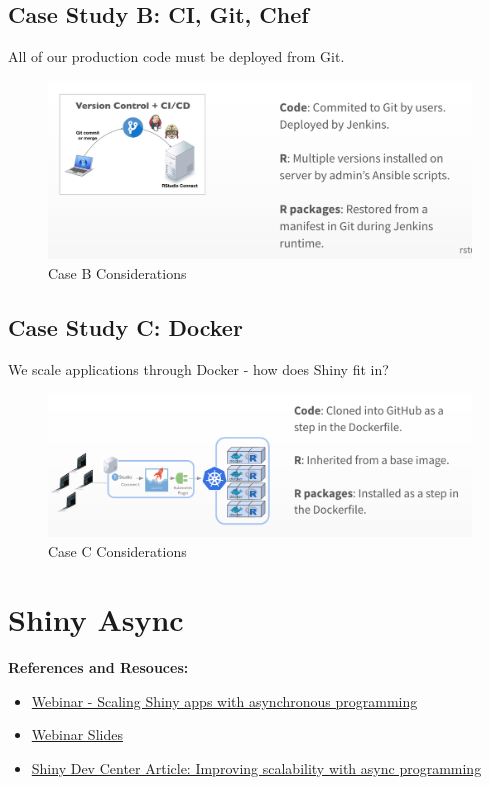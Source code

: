 \documentclass[]{book}
\providecommand{\tightlist}{%
  \setlength{\itemsep}{0pt}\setlength{\parskip}{0pt}}
\theoremstyle{definition}
\theoremstyle{definition}
\theoremstyle{definition}
\theoremstyle{remark}
\begin{document}
\hypertarget{case-study-b-ci-git-chef}{%
\section{Case Study B: CI, Git, Chef}\label{case-study-b-ci-git-chef}}

All of our production code must be deployed from Git.

\begin{figure}
\centering
\includegraphics{imgs/case-studies/case-b.png}
\caption{Case B Considerations}
\end{figure}

\hypertarget{case-study-c-docker}{%
\section{Case Study C: Docker}\label{case-study-c-docker}}

We scale applications through Docker - how does Shiny fit in?

\begin{figure}
\centering
\includegraphics{imgs/case-studies/case-c.png}
\caption{Case C Considerations}
\end{figure}

\hypertarget{shiny-async}{%
\chapter{Shiny Async}\label{shiny-async}}

\textbf{References and Resouces:}

\begin{itemize}
\tightlist
\item
  \href{https://resources.rstudio.com/webinars/scaling-shiny-apps-with-async-programming-june-2018}{Webinar
  - Scaling Shiny apps with asynchronous programming}
\item
  \href{https://github.com/rstudio/webinars/blob/master/56-scaling-shiny-apps/Scaling\%20Shiny\%20apps\%20with\%20async\%20programming.pdf}{Webinar
  Slides}
\item
  \href{http://shiny.rstudio.com/articles/async.html}{Shiny Dev Center
  Article: Improving scalability with async programming}
\end{itemize}
\end{document}
